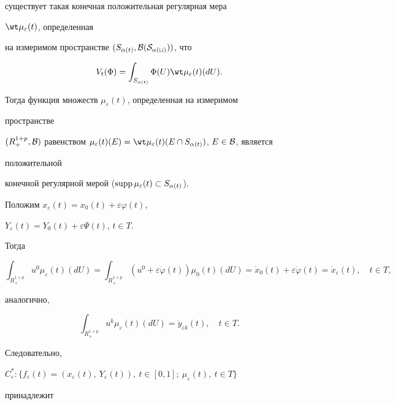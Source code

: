 существует такая конечная положительная регулярная мера 


$\wt\mu_\varepsilon(t)$, определенная 


на измеримом пространстве $(S_{\alpha(t)},\cal B(S_{\alpha(t)}))$, что 


$$ 


V_t(\Phi)=\int_{S_{\alpha(t)}}\Phi(U)\wt\mu_\varepsilon(t) 


(d U). 


$$ 


Тогда функция множеств $\mu_\varepsilon(t)$, определенная на измеримом 


пространстве 


$(R^{1+p}_+,\cal B)$ равенством $\mu_\varepsilon(t)(E)= 


\wt\mu_\varepsilon(t)(E\cap S_{\alpha(t)})$, $E\in\cal B$, является 


положительной 


конечной регулярной мерой ($\supp\mu_\varepsilon(t)\subset 


S_{\alpha(t)}$). 


 


Положим $x_\varepsilon(t)=x_0(t)+\varepsilon\varphi(t)$, 


$Y_\varepsilon(t)=Y_0(t)+\varepsilon\Psi(t)$, $t\in T$. 


Тогда 


$$ 


\int_{R^{1+p}_+}u^0\mu_\varepsilon(t)(d U)= 


\int_{R^{1+p}_+}(u^0+\varepsilon\Dot\varphi(t))\mu_0(t) 


(d U)=\Dot x_0(t)+\varepsilon\Dot\varphi(t)= 


\Dot x_\varepsilon(t),\quad t\in T, 


$$ 


аналогично, 


$$ 


\int_{R^{1+p}_+}u^k\mu_\varepsilon(t)(d U)= 


\Dot y_{\varepsilon k}(t),\quad t\in T. 


$$ 


 


Следовательно, 


$C^*_\varepsilon:\{f_\varepsilon(t)= (x_\varepsilon(t),\ 


Y_\varepsilon(t)),\ t\in[0,1];\ \mu_\varepsilon(t),\ t\in T\}$ 


принадлежит 


